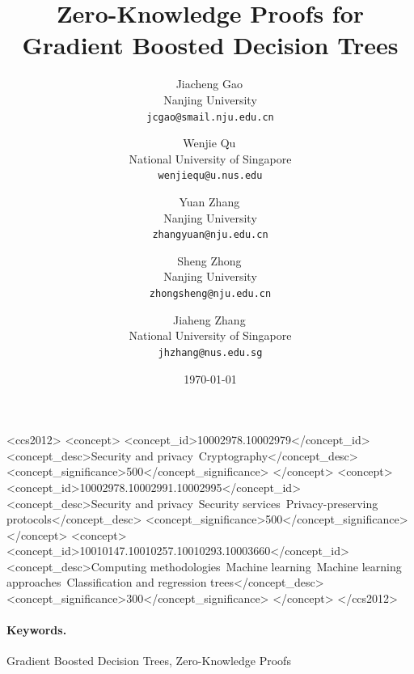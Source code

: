 \documentclass[sigconf]{acmart} %
\title{Zero-Knowledge Proofs for Gradient Boosted Decision Trees}
\author{%
    Jiacheng Gao\,\orcidlink{0000-0003-4288-5954}\\
    Nanjing University\\
    \texttt{jcgao@smail.nju.edu.cn}
    \and
    Wenjie Qu\,\orcidlink{0009-0006-2907-008X}\\
    National University of Singapore\\
    \texttt{wenjiequ@u.nus.edu}
    \and
    Yuan Zhang\,\orcidlink{0000-0001-9682-5231}\\
    Nanjing University\\
    \texttt{zhangyuan@nju.edu.cn}
    \and
    Sheng Zhong\,\orcidlink{0000-0002-6581-8730}\\
    Nanjing University\\
    \texttt{zhongsheng@nju.edu.cn}
    \and
    Jiaheng Zhang\,\orcidlink{0000-0002-7950-7845}\\
    National University of Singapore\\
    \texttt{jhzhang@nus.edu.sg}
  }
\date{\today}
\numberwithin{equation}{section}
\theoremstyle{definition}
\theoremstyle{remark}
\begin{document}
\ifccstemplate
  

\begin{CCSXML} %
<ccs2012>
 <concept>
  <concept_id>10002978.10002979</concept_id>
  <concept_desc>Security and privacy~Cryptography</concept_desc>
  <concept_significance>500</concept_significance>
 </concept>
 <concept>
  <concept_id>10002978.10002991.10002995</concept_id>
  <concept_desc>Security and privacy~Security services~Privacy-preserving protocols</concept_desc>
  <concept_significance>500</concept_significance>
 </concept>
 <concept>
  <concept_id>10010147.10010257.10010293.10003660</concept_id>
  <concept_desc>Computing methodologies~Machine learning~Machine learning approaches~Classification and regression trees</concept_desc>
  <concept_significance>300</concept_significance>
 </concept>
</ccs2012>
\end{CCSXML}



  \maketitle
\else
  \maketitle
  
  \paragraph*{Keywords.}
  Gradient Boosted Decision Trees, Zero-Knowledge Proofs
\fi












\appendix








\end{document}
